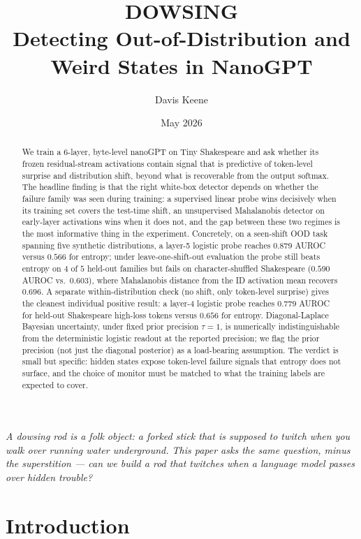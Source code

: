 \documentclass[11pt]{article}
\title{\textbf{DOWSING}\\[0.25em]\large Detecting Out-of-Distribution and Weird States in NanoGPT}
\author{Davis Keene}
\affil{\small \texttt{github.com/daviskeene/dowsing}}
\date{May 2026}
\begin{document}
\maketitle
\thispagestyle{fancy}

\begin{abstract}
\noindent
We train a 6-layer, byte-level nanoGPT on Tiny Shakespeare and ask whether its frozen residual-stream activations contain signal that is predictive of token-level surprise and distribution shift, beyond what is recoverable from the output softmax. The headline finding is that the right white-box detector depends on whether the failure family was seen during training: a supervised linear probe wins decisively when its training set covers the test-time shift, an unsupervised Mahalanobis detector on early-layer activations wins when it does not, and the gap between these two regimes is the most informative thing in the experiment. Concretely, on a seen-shift OOD task spanning five synthetic distributions, a layer-5 logistic probe reaches $0.879$ AUROC versus $0.566$ for entropy; under leave-one-shift-out evaluation the probe still beats entropy on $4$ of $5$ held-out families but fails on character-shuffled Shakespeare ($0.590$ AUROC vs.\ $0.603$), where Mahalanobis distance from the ID activation mean recovers $0.696$. A separate within-distribution check (no shift, only token-level surprise) gives the cleanest individual positive result: a layer-4 logistic probe reaches $0.779$ AUROC for held-out Shakespeare high-loss tokens versus $0.656$ for entropy. Diagonal-Laplace Bayesian uncertainty, under fixed prior precision $\tau=1$, is numerically indistinguishable from the deterministic logistic readout at the reported precision; we flag the prior precision (not just the diagonal posterior) as a load-bearing assumption. The verdict is small but specific: hidden states expose token-level failure signals that entropy does not surface, and the choice of monitor must be matched to what the training labels are expected to cover.
\end{abstract}

\epigraph{\itshape A dowsing rod is a folk object: a forked stick that is supposed to twitch when you walk over running water underground. This paper asks the same question, minus the superstition --- can we build a rod that twitches when a language model passes over hidden trouble?}{}

\section{Introduction}
\end{document}
